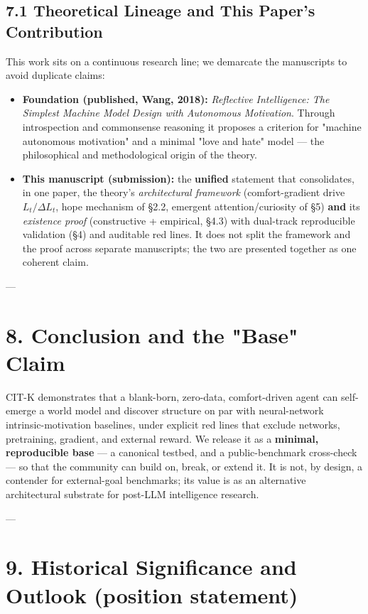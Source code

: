 \documentclass[11pt]{article}
\begin{document}
\subsection{7.1 Theoretical Lineage and This Paper's Contribution}
This work sits on a continuous research line; we demarcate the manuscripts to avoid duplicate claims:
\begin{itemize}
\item \textbf{Foundation (published, Wang, 2018):} \emph{Reflective Intelligence: The Simplest Machine Model Design with Autonomous Motivation}. Through introspection and commonsense reasoning it proposes a criterion for "machine autonomous motivation" and a minimal "love and hate" model — the philosophical and methodological origin of the theory.
\item \textbf{This manuscript (submission):} the \textbf{unified} statement that consolidates, in one paper, the theory's \emph{architectural framework} (comfort-gradient drive $L_t/\Delta L_t$, hope mechanism of §2.2, emergent attention/curiosity of §5) \textbf{and} its \emph{existence proof} (constructive + empirical, §4.3) with dual-track reproducible validation (§4) and auditable red lines. It does not split the framework and the proof across separate manuscripts; the two are presented together as one coherent claim.
\end{itemize}

---

\section{8. Conclusion and the "Base" Claim}

CIT-K demonstrates that a blank-born, zero-data, comfort-driven agent can self-emerge a world model and discover structure on par with neural-network intrinsic-motivation baselines, under explicit red lines that exclude networks, pretraining, gradient, and external reward. We release it as a \textbf{minimal, reproducible base} — a canonical testbed, and a public-benchmark cross-check — so that the community can build on, break, or extend it. It is not, by design, a contender for external-goal benchmarks; its value is as an alternative architectural substrate for post-LLM intelligence research.

---

\section{9. Historical Significance and Outlook (position statement)}
\end{document}
